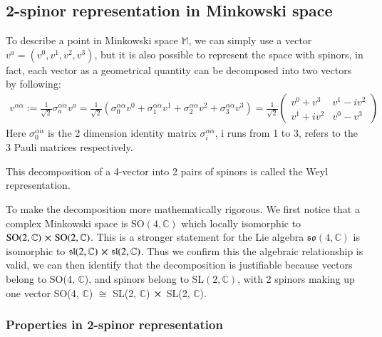 \documentclass{article}
\begin{document}
\subsection{2-spinor representation in Minkowski space}
To describe a point in Minkowski space $ \mathbb{M} $, we can simply use a 
vector $ v^a = (v^0, v^1, v^2, v^3) $, but it is also possible to represent
the space with spinors, in fact, each vector as a geometrical quantity
can be decomposed into two vectors by following:
\begin{align}
  \label{vector to spinor representation}
  v^{\alpha \dot{\alpha}} := \frac{1}{\sqrt{2}} \sigma^{\alpha
  \dot{\alpha}}_{a} v^a = \frac{1}{\sqrt{2} }(\sigma^{\alpha
  \dot{\alpha}}_{0}v^0 + \sigma^{\alpha
  \dot{\alpha}}_{1}v^1 + \sigma^{\alpha
  \dot{\alpha}}_{2}v^2 +  \sigma^{\alpha
  \dot{\alpha}}_{3}v^3   ) =  
  \frac{1}{\sqrt{2} }
  \begin{pmatrix}
  v^0 + v^3 & v^1 - i v^2 \\ 
  v^1 + i v^2 & v^0 - v^3
  \end{pmatrix}
\end{align}
Here $  \sigma^{\alpha
  \dot{\alpha}}_{0}  $ is the 2 dimension identity matrix $ \sigma^{\alpha 
  \dot{\alpha}}_{i}   $, i runs from 1 to 3, refers to the 3 Pauli
  matrices respectively.

This decomposition of a 4-vector into 2 pairs of spinors is called the Weyl
representation\cite{weylrep1998}.

To make the decomposition more mathematically rigorous. We first notice that 
a complex Minkowski space is SO$(4, \mathbb{C}) $ which
locally isomorphic to $ \text{SO}(2, \mathbb{C}) \cross \text{SO}(2, \mathbb{C})
$. This is a stronger statement for the Lie algebra  $
\mathfrak{so}(4, \mathbb{C})$ is isomorphic to $ \mathfrak{sl}(2,
\mathbb{C}) \cross \mathfrak{sl}(2, \mathbb{C})$. Thus we confirm this
the algebraic relationship is valid, we can then identify that the
decomposition is justifiable because vectors belong to SO(4,
$\mathbb{C}$), and spinors belong to  SL$(2,\mathbb{C})$, with 2 spinors
making up one vector SO(4, $ \mathbb{C} $) $\cong $  SL(2, $ \mathbb{C} $)
$ \cross $ SL(2, $ \mathbb{C} $).



\subsubsection{Properties in 2-spinor representation}%
  \label{sub: Properties in 2-spinor representation}
 
\end{document}

